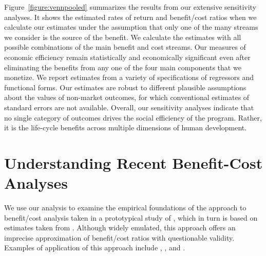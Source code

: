 Figure~\ref{figure:vennpooled} summarizes the results from our extensive sensitivity analyses. It shows the estimated rates of return and benefit/cost ratios when we calculate our estimates under the assumption that only one of the many streams we consider is the source of the benefit. We calculate the estimates with all possible combinations of the main benefit and cost streams. Our measures of economic efficiency remain statistically and economically significant even after eliminating the benefits from any one of the four main components that we monetize. We report estimates from a variety of specifications of regressors and functional forms. Our estimates are robust to different plausible assumptions about the values of non-market outcomes, for which conventional estimates of standard errors are not available. Overall, our sensitivity analyses indicate that no single category of outcomes drives the social efficiency of the program. Rather, it is the life-cycle benefits across multiple dimensions of human development.

\section{Understanding Recent Benefit-Cost Analyses} \label{section:bcaestimates}

We use our analysis to examine the empirical foundations of the approach to benefit/cost analysis taken in a prototypical study of \citet{Kline_Walters_2016_QJE}, which in turn is based on estimates taken from \citet{Chetty_Friedman_etal_2011_QJoE}. Although widely emulated, this approach offers an imprecise approximation of benefit/cost ratios with questionable validity. Examples of application of this approach include \citet{Attanasio_Kugler_Meghir_2011_AEJAE}, \cite{Behrman-et-al_2011_JHR-Progresa}, and \cite{Lafortune_etal_2018_Reform_AEJAE}.

